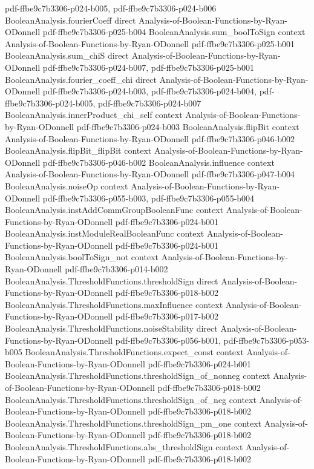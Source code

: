 \begin{theorem}
  {pdf-ffbe9c7b3306-p024-b005,
    pdf-ffbe9c7b3306-p024-b006}
\proofstep
  {BooleanAnalysis.fourierCoeff}
  {direct}
  {Analysis-of-Boolean-Functions-by-Ryan-ODonnell}
  {pdf-ffbe9c7b3306-p025-b004}
\proofstep
  {BooleanAnalysis.sum_boolToSign}
  {context}
  {Analysis-of-Boolean-Functions-by-Ryan-ODonnell}
  {pdf-ffbe9c7b3306-p025-b001}
\proofstep
  {BooleanAnalysis.sum_chiS}
  {direct}
  {Analysis-of-Boolean-Functions-by-Ryan-ODonnell}
  {pdf-ffbe9c7b3306-p024-b007,
    pdf-ffbe9c7b3306-p025-b001}
\proofstep
  {BooleanAnalysis.fourier_coeff_chi}
  {direct}
  {Analysis-of-Boolean-Functions-by-Ryan-ODonnell}
  {pdf-ffbe9c7b3306-p024-b003,
    pdf-ffbe9c7b3306-p024-b004,
    pdf-ffbe9c7b3306-p024-b005,
    pdf-ffbe9c7b3306-p024-b007}
\proofstep
  {BooleanAnalysis.innerProduct_chi_self}
  {context}
  {Analysis-of-Boolean-Functions-by-Ryan-ODonnell}
  {pdf-ffbe9c7b3306-p024-b003}
\proofstep
  {BooleanAnalysis.flipBit}
  {context}
  {Analysis-of-Boolean-Functions-by-Ryan-ODonnell}
  {pdf-ffbe9c7b3306-p046-b002}
\proofstep
  {BooleanAnalysis.flipBit_flipBit}
  {context}
  {Analysis-of-Boolean-Functions-by-Ryan-ODonnell}
  {pdf-ffbe9c7b3306-p046-b002}
\proofstep
  {BooleanAnalysis.influence}
  {context}
  {Analysis-of-Boolean-Functions-by-Ryan-ODonnell}
  {pdf-ffbe9c7b3306-p047-b004}
\proofstep
  {BooleanAnalysis.noiseOp}
  {context}
  {Analysis-of-Boolean-Functions-by-Ryan-ODonnell}
  {pdf-ffbe9c7b3306-p055-b003,
    pdf-ffbe9c7b3306-p055-b004}
\proofstep
  {BooleanAnalysis.instAddCommGroupBooleanFunc}
  {context}
  {Analysis-of-Boolean-Functions-by-Ryan-ODonnell}
  {pdf-ffbe9c7b3306-p024-b001}
\proofstep
  {BooleanAnalysis.instModuleRealBooleanFunc}
  {context}
  {Analysis-of-Boolean-Functions-by-Ryan-ODonnell}
  {pdf-ffbe9c7b3306-p024-b001}
\proofstep
  {BooleanAnalysis.boolToSign_not}
  {context}
  {Analysis-of-Boolean-Functions-by-Ryan-ODonnell}
  {pdf-ffbe9c7b3306-p014-b002}
\proofstep
  {BooleanAnalysis.ThresholdFunctions.thresholdSign}
  {direct}
  {Analysis-of-Boolean-Functions-by-Ryan-ODonnell}
  {pdf-ffbe9c7b3306-p018-b002}
\proofstep
  {BooleanAnalysis.ThresholdFunctions.maxInfluence}
  {context}
  {Analysis-of-Boolean-Functions-by-Ryan-ODonnell}
  {pdf-ffbe9c7b3306-p017-b002}
\proofstep
  {BooleanAnalysis.ThresholdFunctions.noiseStability}
  {direct}
  {Analysis-of-Boolean-Functions-by-Ryan-ODonnell}
  {pdf-ffbe9c7b3306-p056-b001,
    pdf-ffbe9c7b3306-p053-b005}
\proofstep
  {BooleanAnalysis.ThresholdFunctions.expect_const}
  {context}
  {Analysis-of-Boolean-Functions-by-Ryan-ODonnell}
  {pdf-ffbe9c7b3306-p024-b001}
\proofstep
  {BooleanAnalysis.ThresholdFunctions.thresholdSign_of_nonneg}
  {context}
  {Analysis-of-Boolean-Functions-by-Ryan-ODonnell}
  {pdf-ffbe9c7b3306-p018-b002}
\proofstep
  {BooleanAnalysis.ThresholdFunctions.thresholdSign_of_neg}
  {context}
  {Analysis-of-Boolean-Functions-by-Ryan-ODonnell}
  {pdf-ffbe9c7b3306-p018-b002}
\proofstep
  {BooleanAnalysis.ThresholdFunctions.thresholdSign_pm_one}
  {context}
  {Analysis-of-Boolean-Functions-by-Ryan-ODonnell}
  {pdf-ffbe9c7b3306-p018-b002}
\proofstep
  {BooleanAnalysis.ThresholdFunctions.abs_thresholdSign}
  {context}
  {Analysis-of-Boolean-Functions-by-Ryan-ODonnell}
  {pdf-ffbe9c7b3306-p018-b002}


\end{theorem}
